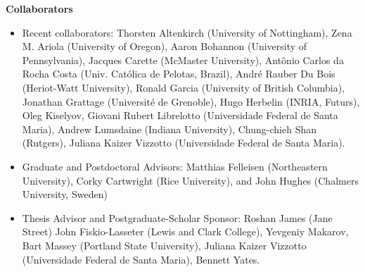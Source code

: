 \documentclass[11pt]{article}
\begin{document}

\begin{center}
{\Large {\bf Collaborators}}
\end{center}

\begin{itemize}
\item Recent collaborators:
  Thorsten Altenkirch (University of Nottingham),
  Zena M. Ariola (University of Oregon),
  Aaron Bohannon (University of Pennsylvania),
  Jacques Carette (McMaster University),
  Ant\^onio Carlos da Rocha Costa (Univ. Cat\'olica de Pelotas, Brazil),
  Andr\'e Rauber Du Bois (Heriot-Watt University),
  Ronald Garcia (University of British Columbia),
  Jonathan Grattage (Universit\'e de Grenoble),
  Hugo Herbelin (INRIA, Futurs),
  Oleg Kiselyov,
  Giovani Rubert Librelotto (Universidade Federal de Santa Maria),
  Andrew Lumsdaine (Indiana University),
  Chung-chieh Shan (Rutgers),    
  Juliana Kaizer Vizzotto (Universidade Federal de Santa Maria).

\item Graduate and Postdoctoral Advisors: Matthias Felleisen (Northeastern
  University), Corky Cartwright (Rice University), and John Hughes (Chalmers
  University, Sweden)

\item Thesis Advisor and Postgraduate-Scholar Sponsor: 
    Roshan James (Jane Street) 
    John Fiskio-Lasseter (Lewis and Clark College), 
    Yevgeniy Makarov,
    Bart Massey (Portland State University),
    Juliana Kaizer Vizzotto (Universidade Federal de Santa Maria),
    Bennett Yates.
 
\end{itemize}
\end{document}
